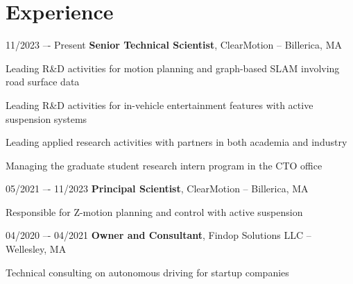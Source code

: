 \section{Experience}
\begin{twocolentry}{11/2023 –- Present}
\textbf{Senior Technical Scientist}, ClearMotion -- Billerica, MA\end{twocolentry}
\vspace{0.10 cm}

\begin{onecolentry}
\begin{highlights}
\item Leading R\&D activities for motion planning and graph-based SLAM involving road surface data
\item Leading R\&D activities for in-vehicle entertainment features with active suspension systems
\item Leading applied research activities with partners in both academia and industry
\item Managing the graduate student research intern program in the CTO office
\end{highlights}
\end{onecolentry}
\vspace{0.25 cm}

\begin{twocolentry}{05/2021 –- 11/2023}
\textbf{Principal Scientist}, ClearMotion -- Billerica, MA\end{twocolentry}
\vspace{0.10 cm}
\begin{onecolentry}
\begin{highlights}
\item Responsible for Z-motion planning and control with active suspension
\end{highlights}
\end{onecolentry}
\vspace{0.25 cm}

\begin{twocolentry}{
04/2020 –- 04/2021
}
\textbf{Owner and Consultant}, Findop Solutions LLC -- Wellesley, MA\end{twocolentry}
\vspace{0.10 cm}
\begin{onecolentry}
\begin{highlights}
\item Technical consulting on autonomous driving for startup companies
\end{highlights}
\end{onecolentry}
\vspace{0.25 cm}

